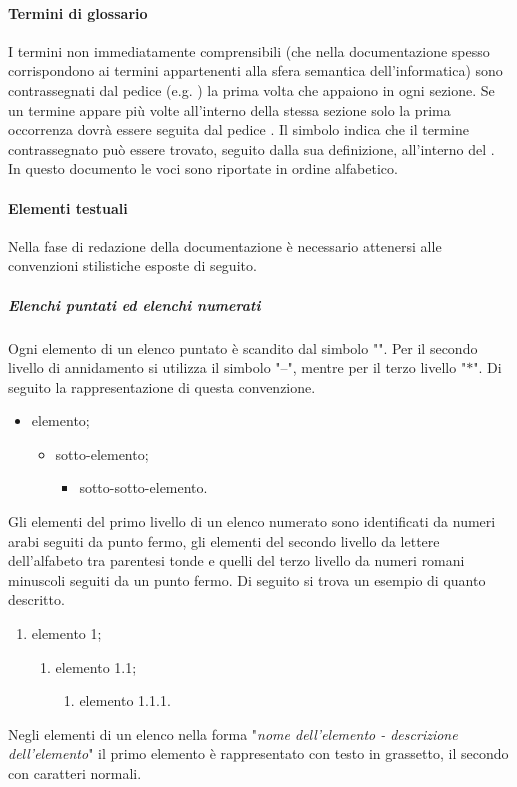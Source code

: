 \paragraph{Termini di glossario} \label{_terminiDiGlossario}
I termini non immediatamente comprensibili (che nella documentazione spesso corrispondono ai termini appartenenti alla sfera semantica dell'informatica) sono contrassegnati dal pedice \glock{} (e.g. ) la prima volta che appaiono in ogni sezione. Se un termine appare più volte all'interno della stessa sezione solo la prima occorrenza dovrà essere seguita dal pedice \glock{}. Il simbolo indica che il termine contrassegnato può essere trovato, seguito dalla sua definizione, all'interno del . In questo documento le voci sono riportate in ordine alfabetico.

\paragraph{Elementi testuali}
Nella fase di redazione della documentazione è necessario attenersi alle convenzioni stilistiche esposte di seguito.

\subparagraph{Elenchi puntati ed elenchi numerati}
Ogni elemento di un elenco puntato è scandito dal simbolo "\textbullet". Per il secondo livello di annidamento si utilizza il simbolo "--", mentre per il terzo livello "$\ast$". Di seguito la rappresentazione di questa convenzione.
\begin{itemize}
    \item elemento;
          \begin{itemize}
              \item sotto-elemento;
                    \begin{itemize}
                        \item sotto-sotto-elemento.
                    \end{itemize}
          \end{itemize}
\end{itemize}
Gli elementi del primo livello di un elenco numerato sono identificati da numeri arabi seguiti da punto fermo, gli elementi del secondo livello da lettere dell'alfabeto tra parentesi tonde e quelli del terzo livello da numeri romani minuscoli seguiti da  un punto fermo. Di seguito si trova un esempio di quanto descritto.
\begin{enumerate}
    \item elemento 1;
          \begin{enumerate}
              \item elemento 1.1;
                    \begin{enumerate}
                        \item elemento 1.1.1.
                    \end{enumerate}
          \end{enumerate}
\end{enumerate}
Negli elementi di un elenco nella forma "\textit{nome dell'elemento - descrizione dell'elemento}"  il primo elemento è rappresentato con testo in grassetto, il secondo con caratteri normali.

